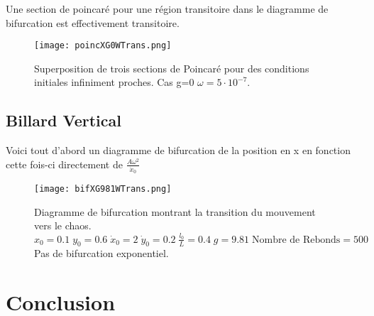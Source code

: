 \documentclass[a4paper]{report}
\begin{document}
Une section de poincaré pour une région transitoire dans le diagramme de bifurcation est effectivement transitoire.
\begin{figure}[H]
   \texttt{[image: poincXG0WTrans.png]}
      \caption[Section de Poincaré transitoire: g=0 \(\omega=5 \cdot 10^{-9}\)]{Superposition de trois sections de Poincaré pour des conditions initiales infiniment proches. Cas g=0 \(\omega=5 \cdot 10^{-7}\).}
\end{figure}

\section{Billard Vertical}
Voici tout d'abord un diagramme de bifurcation de la position en x en fonction cette fois-ci directement de \( \frac{A \omega ^2 }{\dot{x}_0}\)



\begin{figure}[H]
   \texttt{[image: bifXG981WTrans.png]}
      \caption[Transition du mouvement vers le chaos en fonction de \( \frac{A \omega ^2 }{\dot{x}_0}\): g=9.81]{Diagramme de bifurcation montrant la transition du mouvement vers le chaos.\\ \(x_0=0.1 \; y_0=0.6 \; \dot{x}_0=2 \; \dot{y}_0=0.2 \; \frac{l_0}{L}=0.4 \; g=9.81 \; \text{Nombre de Rebonds}=500\) Pas de bifurcation exponentiel.}
\end{figure}







\chapter{Conclusion}


%
%
\end{document}
